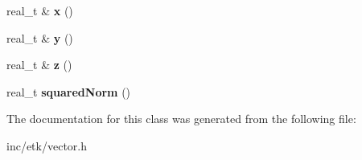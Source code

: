 \begin{DoxyCompactItemize}
\item 
\hypertarget{classetk_1_1_vector_af70c693a2e3097536ca8d2c154dd8749}{real\-\_\-t \& {\bfseries x} ()}\label{classetk_1_1_vector_af70c693a2e3097536ca8d2c154dd8749}

\item 
\hypertarget{classetk_1_1_vector_ab313621c7c844e15d3146ddd0aa4242e}{real\-\_\-t \& {\bfseries y} ()}\label{classetk_1_1_vector_ab313621c7c844e15d3146ddd0aa4242e}

\item 
\hypertarget{classetk_1_1_vector_abd580f04a12c3162d299b77581425a5d}{real\-\_\-t \& {\bfseries z} ()}\label{classetk_1_1_vector_abd580f04a12c3162d299b77581425a5d}

\item 
\hypertarget{classetk_1_1_vector_a3b3848f4c15364b8c91b23b9ad177dd9}{real\-\_\-t {\bfseries squared\-Norm} ()}\label{classetk_1_1_vector_a3b3848f4c15364b8c91b23b9ad177dd9}

\end{DoxyCompactItemize}


The documentation for this class was generated from the following file\-:\begin{DoxyCompactItemize}
\item 
inc/etk/vector.\-h\end{DoxyCompactItemize}
